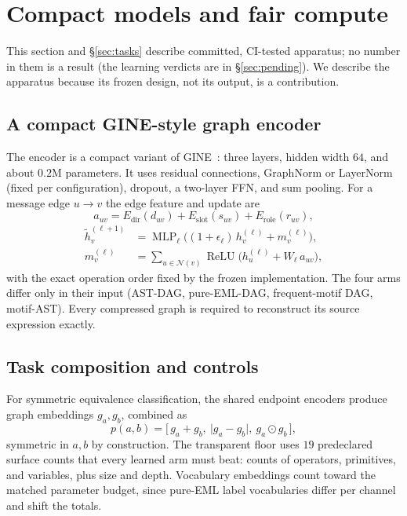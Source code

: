 \documentclass[11pt]{article}
\begin{document}
\section{Compact models and fair compute}
\label{sec:models}

This section and \S\ref{sec:tasks} describe committed, CI-tested apparatus; no
number in them is a result (the learning verdicts are in \S\ref{sec:pending}).
We describe the apparatus because its frozen design, not its output, is a
contribution.

\subsection{A compact GINE-style graph encoder}
The encoder is a compact variant of GINE~\cite{xu2019powerful,hu2020strategies}:
three layers, hidden width $64$, and about $0.2$M parameters. It uses residual connections, GraphNorm or LayerNorm (fixed per configuration),
dropout, a two-layer FFN, and sum pooling.
For a message edge $u\rightarrow v$ the edge feature and update are
\begin{equation}
a_{uv}=E_{\mathrm{dir}}(d_{uv})+E_{\mathrm{slot}}(s_{uv})+E_{\mathrm{role}}(r_{uv}),
\end{equation}
\begin{equation}
\begin{aligned}
\widetilde h_v^{(\ell+1)}
&=\operatorname{MLP}_{\ell}\big((1+\epsilon_\ell)\,h_v^{(\ell)}+m_v^{(\ell)}\big),\\
m_v^{(\ell)}&=\sum_{u\in\mathcal N(v)}
\operatorname{ReLU}\big(h_u^{(\ell)}+W_\ell\,a_{uv}\big),
\end{aligned}
\end{equation}
with the exact operation order fixed by the frozen implementation. The four
arms differ only in their input (AST-DAG, pure-EML-DAG, frequent-motif DAG,
motif-AST). Every compressed graph is required to reconstruct its source
expression exactly.

\subsection{Task composition and controls}
For symmetric equivalence classification, the shared endpoint encoders produce
graph embeddings $g_a,g_b$, combined as
\begin{equation}
p(a,b)=\big[\,g_a+g_b,\ \lvert g_a-g_b\rvert,\ g_a\odot g_b\,\big],
\label{eq:pair}
\end{equation}
symmetric in $a,b$ by construction. The transparent floor uses $19$ predeclared
surface counts that every learned arm must beat: counts of operators,
primitives, and variables, plus size and depth. Vocabulary embeddings count toward the matched parameter
budget, since pure-EML label vocabularies differ per channel and shift the
totals.
\end{document}
